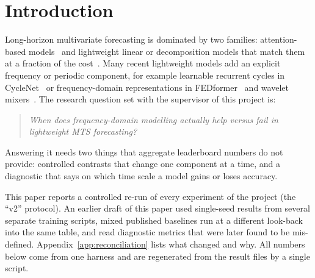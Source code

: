 \documentclass[11pt,a4paper]{article}
\begin{document}
\section{Introduction}
\label{sec:intro}
Long-horizon multivariate forecasting is dominated by two families: attention-based models~\cite{wu2021autoformer, zhou2022fedformer, nie2023patchtst} and lightweight linear or decomposition models that match them at a fraction of the cost~\cite{zeng2023dlinear}. Many recent lightweight models add an explicit frequency or periodic component, for example learnable recurrent cycles in CycleNet~\cite{liu2024cyclenet} or frequency-domain representations in FEDformer~\cite{zhou2022fedformer} and wavelet mixers~\cite{wpmixer2024}. The research question set with the supervisor of this project is:
\begin{quote}
\emph{When does frequency-domain modelling actually help versus fail in lightweight MTS forecasting?}
\end{quote}
Answering it needs two things that aggregate leaderboard numbers do not provide: controlled contrasts that change one component at a time, and a diagnostic that says on which time scale a model gains or loses accuracy.

This paper reports a controlled re-run of every experiment of the project (the ``v2'' protocol). An earlier draft of this paper used single-seed results from several separate training scripts, mixed published baselines run at a different look-back into the same table, and read diagnostic metrics that were later found to be mis-defined. Appendix~\ref{app:reconciliation} lists what changed and why. All numbers below come from one harness and are regenerated from the result files by a single script.
\end{document}
